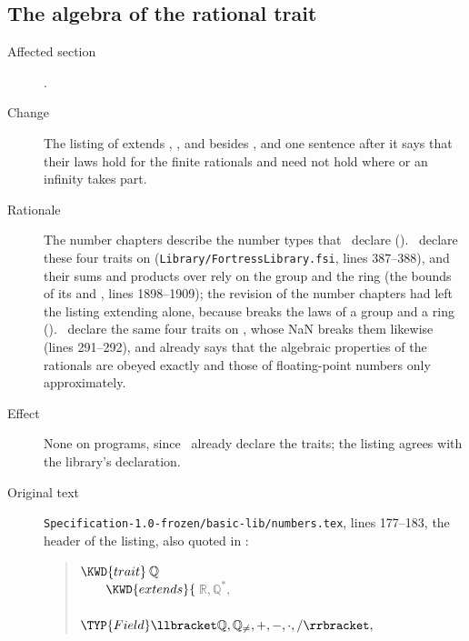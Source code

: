 \subsection{The algebra of the rational trait}

\begin{description}
\item[Affected section] .
\item[Change] The listing of  extends
,
,
 and
 besides ,
and one sentence after it says that their laws hold for the finite rationals and need
not hold where  or an infinity takes part.
\item[Rationale] The number chapters describe the number types that \library\
declare ().
\Library\ declare these four traits on 
(\nolinkurl{Library/FortressLibrary.fsi}, lines 387--388), and their sums and
products over \EXP{\mathbb{Q}} rely on the group and the ring (the bounds of its
\OPR{SUM} and \OPR{PROD}, lines 1898--1909); the revision of the number chapters had left the listing
extending \TYP{Number} alone,
because  breaks the laws of a group and a ring
().
\Library\ declare the same four traits on , whose NaN breaks them
likewise (lines 291--292), and \secref{opr-properties} already says that the
algebraic properties of the rationals are obeyed exactly and those of floating-point
numbers only approximately.
\item[Effect] None on programs, since \library\ already declare the traits; the
listing agrees with the library's declaration.
\item[Original text] \nolinkurl{Specification-1.0-frozen/basic-lib/numbers.tex},
lines 177--183, the header of the listing, also quoted in :
\begin{quote}
\begin{Fortress}
\(\KWD{trait}\:\mathbb{Q}\)\\
{\tt~~~~}\(    \KWD{extends} \{\, \null\)\(\mathbb{R}, \mathbb{Q}^*,\)\\
{\tt~~~~~~~~~~~~~~}\(              \TYP{Field}\llbracket\mathbb{Q},\mathbb{Q}_{\neq},+,-,\cdot,/\rrbracket,\)\\

\end{Fortress}
\end{quote}
\end{description}
